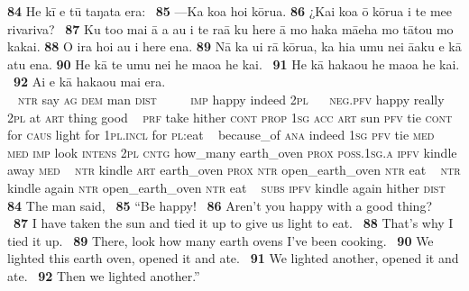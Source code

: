 {\bigskip\gll
\textbf{\textup{84}} He kī e tū taŋata era: ~\textbf{\textup{85}} —Ka koa ho{\ꞌ}i kōrua. \textbf{\textup{86}} ¿Kai koa {\ꞌ}ō kōrua {\ꞌ}i te me{\ꞌ}e rivariva? ~\textbf{\textup{87}} Ku to{\ꞌ}o mai {\ꞌ}ā a au i te ra{\ꞌ}ā ku here {\ꞌ}ā mo haka mā{\ꞌ}eha mo tātou mo kakai. \textbf{\textup{88}} {\ꞌ}O ira ho{\ꞌ}i au i here ena. \textbf{\textup{89}} Nā ka u{\ꞌ}i rā kōrua, ka hia {\ꞌ}umu nei {\ꞌ}ā{\ꞌ}aku e kā atu ena. \textbf{\textup{90}} He kā te {\ꞌ}umu nei he ma{\ꞌ}oa he kai. ~\textbf{\textup{91}} He kā haka{\ꞌ}ou he ma{\ꞌ}oa he kai. ~\textbf{\textup{92}} {\ꞌ}Ai e kā haka{\ꞌ}ou mai era.\\
~ \textsc{ntr} say \textsc{ag} \textsc{dem} man \textsc{dist} ~ ~~~\textsc{imp} happy indeed \textsc{2pl}  ~ ~\textsc{neg.pfv} happy really \textsc{2pl} at \textsc{art} thing good ~ \textsc{prf} take hither \textsc{cont} \textsc{prop} \textsc{1sg} \textsc{acc} \textsc{art} sun \textsc{pfv} tie \textsc{cont} for \textsc{caus} light for \textsc{1pl.incl} for \textsc{pl}:eat  ~ because\_of \textsc{ana} indeed \textsc{1sg} \textsc{pfv} tie \textsc{med} ~ \textsc{med} \textsc{imp} look \textsc{intens} \textsc{2pl} \textsc{cntg} how\_many earth\_oven \textsc{prox} \textsc{poss.1sg.a} \textsc{ipfv} kindle away \textsc{med}  ~ \textsc{ntr} kindle \textsc{art} earth\_oven \textsc{prox} \textsc{ntr} open\_earth\_oven \textsc{ntr} eat ~ \textsc{ntr} kindle again \textsc{ntr} open\_earth\_oven \textsc{ntr} eat ~ \textsc{subs} \textsc{ipfv} kindle again hither \textsc{dist}\\

\medskip\glt
\textbf{\textup{84}} The man said, ~\textbf{\textup{85}} “Be happy! ~\textbf{\textup{86}} Aren’t you happy with a good thing? ~ ~\textbf{\textup{87}} I have taken the sun and tied it up to give us light to eat. ~\textbf{\textup{88}} That’s why I tied it up. ~\textbf{\textup{89}} There, look how many earth ovens I’ve been cooking. ~\textbf{\textup{90}} We lighted this earth oven, opened it and ate. ~\textbf{\textup{91}} We lighted another, opened it and ate. ~\textbf{\textup{92}} Then we lighted another.”


~

}
